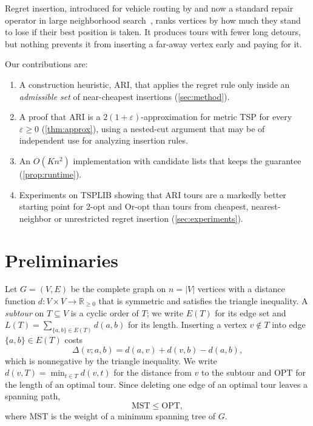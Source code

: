 \documentclass[11pt]{article}
\theoremstyle{definition}
\theoremstyle{remark}
\newcommand{\OPT}{\mathrm{OPT}}
\newcommand{\MST}{\mathrm{MST}}
\begin{document}
Regret insertion, introduced for vehicle routing by \citet{potvin1993} and now a standard repair operator in large neighborhood search~\cite{ropke2006}, ranks vertices by how much they stand to lose if their best position is taken. It produces tours with fewer long detours, but nothing prevents it from inserting a far-away vertex early and paying for it.

Our contributions are:
\begin{enumerate}
  \item A construction heuristic, ARI, that applies the regret rule only inside an \emph{admissible set} of near-cheapest insertions (\cref{sec:method}).
  \item A proof that ARI is a $2(1+\varepsilon)$-approximation for metric TSP for every $\varepsilon \ge 0$ (\cref{thm:approx}), using a nested-cut argument that may be of independent use for analyzing insertion rules.
  \item An $O(Kn^2)$ implementation with candidate lists that keeps the guarantee (\cref{prop:runtime}).
  \item Experiments on TSPLIB showing that ARI tours are a markedly better starting point for 2-opt and Or-opt than tours from cheapest, nearest-neighbor or unrestricted regret insertion (\cref{sec:experiments}).
\end{enumerate}

\section{Preliminaries}
\label{sec:prelim}

Let $G = (V, E)$ be the complete graph on $n = |V|$ vertices with a distance function $d : V \times V \to \mathbb{R}_{\ge 0}$ that is symmetric and satisfies the triangle inequality. A \emph{subtour} on $T \subseteq V$ is a cyclic order of $T$; we write $E(T)$ for its edge set and $L(T) = \sum_{\{a,b\} \in E(T)} d(a,b)$ for its length. Inserting a vertex $v \notin T$ into edge $\{a,b\} \in E(T)$ costs
\begin{equation}
  \Delta(v; a, b) = d(a, v) + d(v, b) - d(a, b),
  \label{eq:insertion-cost}
\end{equation}
which is nonnegative by the triangle inequality. We write $d(v, T) = \min_{t \in T} d(v, t)$ for the distance from $v$ to the subtour and $\OPT$ for the length of an optimal tour. Since deleting one edge of an optimal tour leaves a spanning path,
\begin{equation}
  \MST \le \OPT,
  \label{eq:mst-opt}
\end{equation}
where $\MST$ is the weight of a minimum spanning tree of $G$.
\end{document}

